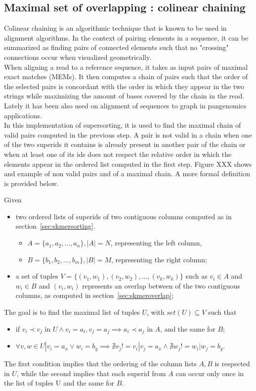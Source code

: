 \subsection{Maximal set of overlapping \kmers: colinear chaining}
Colinear chaining is an algorithmic technique that is known to be used in alignment algorithms. In the context of pairing elements in a sequence, it can be summarized as finding pairs of connected elements such that no "crossing" connections occur when visualized geometrically. \\
When aligning a read to a reference sequence, it takes as input pairs of maximal exact matches (MEMs). It then computes a chain of pairs such that the order of the selected pairs is concordant with the order in which they appear in the two strings while maximizing the amount of bases covered by the chain in the read. Lately it has been also used on alignment of sequences to graph in pangenomics applications.\\
In this implementation of super\kmer sorting, it is used to find the maximal chain of valid pairs computed in the previous step. A pair is not valid in a chain when one of the two super\kmer ids it contains is already present in another pair of the chain or when at least one of its ids does not respect the relative order in which the elements appear in the ordered list computed in the first step. Figure XXX shows and example of non valid pairs and of a maximal chain. A more formal definition is provided below.\\
\begin{definition}
	Given \begin{itemize}
		\item two ordered lists of super\kmer ids of two contiguous columns computed as in section~\ref{sec:skmersorting}.
		\begin{itemize}
			\item $ A = \{a_1, a_2, ..., a_n\}, |A| = N $, representing the left column,
			\item $ B = \{b_1, b_2, ..., b_m\}, |B| = M $, representing the right column;
		\end{itemize}
		\item a set of tuples $ V = \{(v_1,w_1),(v_2,w_2), ..., (v_k,w_k) \}$ such as $ v_i \in A$ and $ w_i \in B$ and $(v_i,w_i)$ represents an overlap between \kmers of the two contiguous columns, as computed in section~\ref{sec:skmeroverlap};
	\end{itemize}
	The goal is to find the maximal list of tuples $ U$, with $set(U) \subseteq V$ such that 
	\begin{itemize}
		\item if $v_i \prec v_j$ in $U \land v_i=a_i, v_j=a_j \implies a_i \prec a_j$ in $A$, and the same for $B$;
		\item $\forall v, w \in U | v_i = a_x \lor w_i = b_y \implies \nexists v_j != v_i | v_j = a_x \land \nexists w_j != w_i | w_j = b_y$.  
	\end{itemize}
	The first condition implies that the ordering of the column lists $A, B$ is respected in $U$, while the second implies that each super\kmer id from $A$ can occur only once in the list of tuples U and the same for $B$.
\end{definition}
